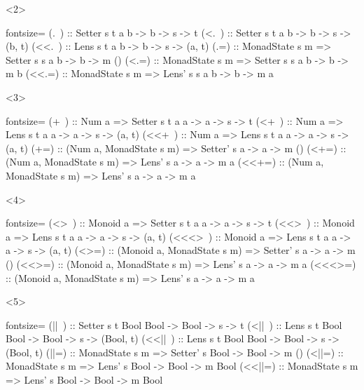 \documentclass{beamer}
\begin{document}
{\begin{frame}[fragile]
  \begin{onlyenv}<2>
\begin{haskellcode*}{fontsize=\small}
   (.~) :: Setter s t a b -> b -> s ->     t
  (<.~) :: Setter s t a b -> b -> s -> (b, t)
 (<<.~) :: Lens   s t a b -> b -> s -> (a, t)
   (.=) :: MonadState s m => Setter s s a b -> b -> m ()
  (<.=) :: MonadState s m => Setter s s a b -> b -> m b
 (<<.=) :: MonadState s m => Lens'  s s a b -> b -> m a
\end{haskellcode*}
  \end{onlyenv}

  \begin{onlyenv}<3>
\begin{haskellcode*}{fontsize=\small}
   (+~) ::  Num a => Setter s t a a -> a -> s ->     t
  (<+~) ::  Num a => Lens   s t a a -> a -> s -> (a, t)
 (<<+~) ::  Num a => Lens   s t a a -> a -> s -> (a, t)
   (+=) :: (Num a, MonadState s m) => Setter' s a -> a -> m ()
  (<+=) :: (Num a, MonadState s m) => Lens'   s a -> a -> m a
 (<<+=) :: (Num a, MonadState s m) => Lens'   s a -> a -> m a
\end{haskellcode*}
  \end{onlyenv}

  \begin{onlyenv}<4>
\begin{haskellcode*}{fontsize=\small}
  (<>~) ::  Monoid a => Setter s t a a -> a -> s ->     t
 (<<>~) ::  Monoid a => Lens   s t a a -> a -> s -> (a, t)
(<<<>~) ::  Monoid a => Lens   s t a a -> a -> s -> (a, t)
  (<>=) :: (Monoid a, MonadState s m) => Setter' s a -> a -> m ()
 (<<>=) :: (Monoid a, MonadState s m) => Lens'   s a -> a -> m a
(<<<>=) :: (Monoid a, MonadState s m) => Lens'   s a -> a -> m a
\end{haskellcode*}
  \end{onlyenv}

  \begin{onlyenv}<5>
\begin{haskellcode*}{fontsize=\small}
  (||~) :: Setter s t Bool Bool -> Bool -> s ->        t
 (<||~) :: Lens   s t Bool Bool -> Bool -> s -> (Bool, t)
(<<||~) :: Lens   s t Bool Bool -> Bool -> s -> (Bool, t)
  (||=) :: MonadState s m => Setter' s Bool -> Bool -> m ()
 (<||=) :: MonadState s m => Lens'   s Bool -> Bool -> m Bool
(<<||=) :: MonadState s m => Lens'   s Bool -> Bool -> m Bool
\end{haskellcode*}
  \end{onlyenv}


\end{frame}}
\end{document}
